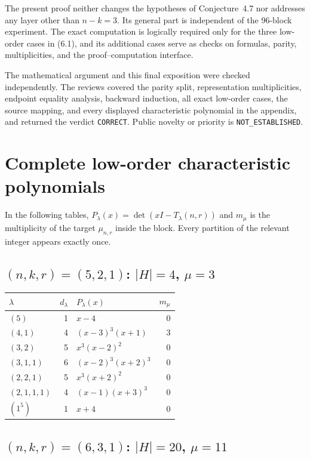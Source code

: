\documentclass[11pt]{article}
\theoremstyle{definition}
\begin{document}
The present proof neither changes the hypotheses of Conjecture~4.7 nor
addresses any layer other than $n-k=3$.  Its general part is independent of
the 96-block experiment.  The exact computation is logically required only
for the three low-order cases in (6.1), and its additional cases serve as
checks on formulas, parity, multiplicities, and the proof--computation
interface.

The mathematical argument and this final exposition were checked
independently.  The reviews covered the parity split, representation
multiplicities, endpoint equality analysis, backward induction, all exact
low-order cases, the source mapping, and every displayed characteristic
polynomial in the appendix, and returned the verdict \texttt{CORRECT}.
Public novelty or priority is \texttt{NOT\_ESTABLISHED}.

\appendix
\section{Complete low-order characteristic polynomials}\label{app:spectra}

In the following tables, $P_\lambda(x)=\det(xI-T_\lambda(n,r))$ and
$m_\mu$ is the multiplicity of the target $\mu_{n,r}$ inside the block.
Every partition of the relevant integer appears exactly once.

\subsection*{$(n,k,r)=(5,2,1)$: $|H|=4$, $\mu=3$}

\begin{center}
\small
\begin{tabularx}{\textwidth}{@{}l r Y r@{}}
\toprule
$\lambda$ & $d_\lambda$ & $P_\lambda(x)$ & $m_\mu$\\
\midrule
$(5)$ & 1 & $x-4$ & 0\\
$(4,1)$ & 4 & $(x-3)^3(x+1)$ & 3\\
$(3,2)$ & 5 & $x^3(x-2)^2$ & 0\\
$(3,1,1)$ & 6 & $(x-2)^3(x+2)^3$ & 0\\
$(2,2,1)$ & 5 & $x^3(x+2)^2$ & 0\\
$(2,1,1,1)$ & 4 & $(x-1)(x+3)^3$ & 0\\
$(1^5)$ & 1 & $x+4$ & 0\\
\bottomrule
\end{tabularx}
\end{center}

\subsection*{$(n,k,r)=(6,3,1)$: $|H|=20$, $\mu=11$}
\end{document}
